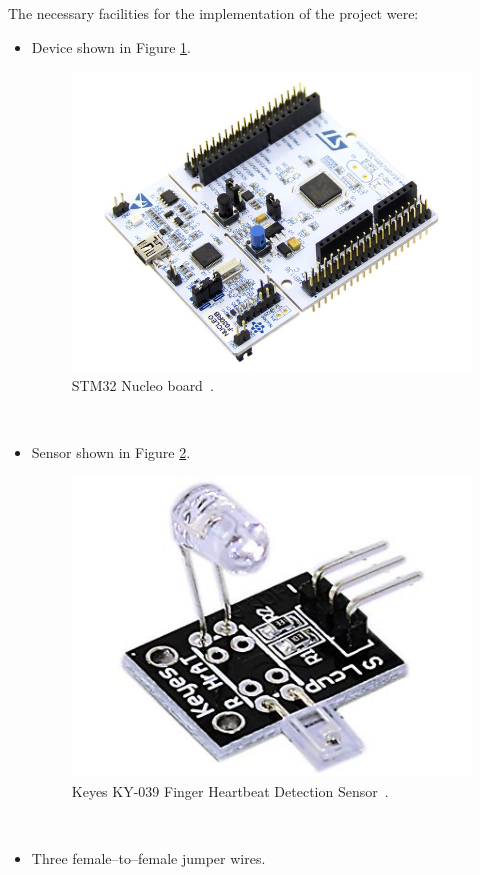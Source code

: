 \documentclass[11pt,a4paper]{article}
\begin{document}
The necessary facilities for the implementation of the project were:\\[-1.5em]
\begin{itemize}
    \item Device shown in Figure \ref{fig:platform1}.
        \begin{figure}[H]
            \centering
            \includegraphics[scale=0.4]{img/device1.jpg}
            \caption{STM32 Nucleo board~\cite{IMG-DEVICE-1}.}
            \label{fig:platform1}
        \end{figure}
        \hfill\\[-17mm]
    \item Sensor shown in Figure \ref{fig:senzor1}.
        \begin{figure}[H]
            \centering
            \includegraphics[scale=0.3]{img/sensor1.jpg}
            \caption{Keyes KY-039 Finger Heartbeat Detection Sensor~\cite{IMG-SENSOR-1}.}
            \label{fig:senzor1}
        \end{figure}
        \hfill\\[-18mm]
    \item Three female--to--female jumper wires.\\[-2.5mm]
\end{itemize}
\end{document}
